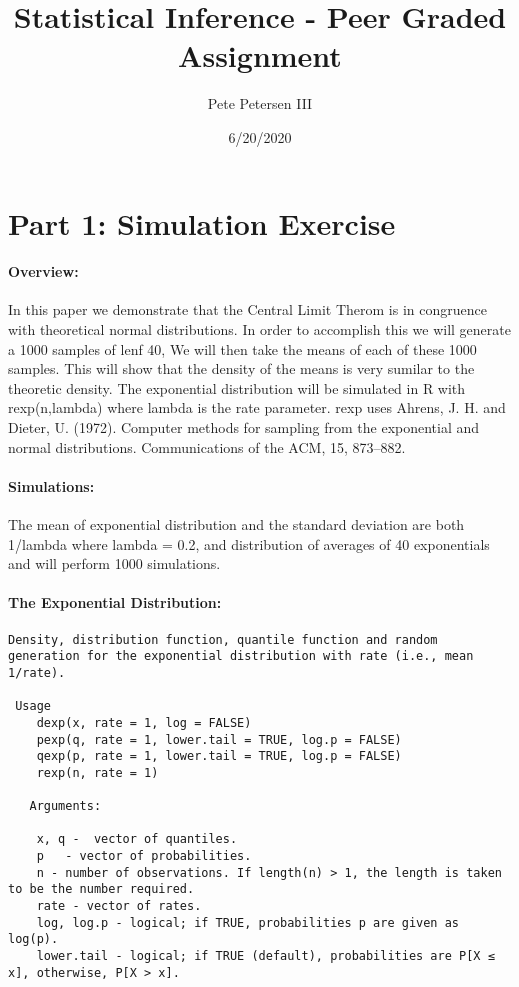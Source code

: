 \documentclass[]{article}
\title{Statistical Inference - Peer Graded Assignment}
\author{Pete Petersen III}
\date{6/20/2020}
\let\oldparagraph\paragraph
\renewcommand{\paragraph}[1]{\oldparagraph{#1}\mbox{}}
\begin{document}
\maketitle

\hypertarget{part-1-simulation-exercise}{%
\section{Part 1: Simulation Exercise}\label{part-1-simulation-exercise}}

\hypertarget{overview}{%
\paragraph{Overview:}\label{overview}}

In this paper we demonstrate that the Central Limit Therom is in
congruence with theoretical normal distributions. In order to accomplish
this we will generate a 1000 samples of lenf 40, We will then take the
means of each of these 1000 samples. This will show that the density of
the means is very sumilar to the theoretic density. The exponential
distribution will be simulated in R with rexp(n,lambda) where lambda is
the rate parameter. rexp uses Ahrens, J. H. and Dieter, U. (1972).
Computer methods for sampling from the exponential and normal
distributions. Communications of the ACM, 15, 873--882.

\hypertarget{simulations}{%
\paragraph{Simulations:}\label{simulations}}

The mean of exponential distribution and the standard deviation are both
1/lambda where lambda = 0.2, and distribution of averages of 40
exponentials and will perform 1000 simulations.

\hypertarget{the-exponential-distribution}{%
\paragraph{The Exponential
Distribution:}\label{the-exponential-distribution}}

\begin{verbatim}
Density, distribution function, quantile function and random generation for the exponential distribution with rate (i.e., mean 1/rate).

 Usage
    dexp(x, rate = 1, log = FALSE)
    pexp(q, rate = 1, lower.tail = TRUE, log.p = FALSE)
    qexp(p, rate = 1, lower.tail = TRUE, log.p = FALSE)
    rexp(n, rate = 1)
   
   Arguments:
   
    x, q -  vector of quantiles.
    p   - vector of probabilities.
    n - number of observations. If length(n) > 1, the length is taken to be the number required.
    rate - vector of rates.
    log, log.p - logical; if TRUE, probabilities p are given as log(p).
    lower.tail - logical; if TRUE (default), probabilities are P[X ≤ x], otherwise, P[X > x].
\end{verbatim}
\end{document}
